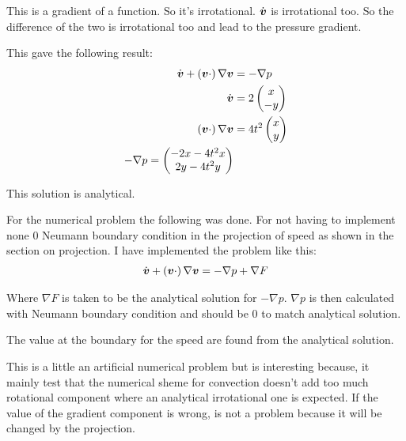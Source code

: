 This is a gradient of a function. So it's irrotational. $\dot{{\boldsymbol {v}}}$ is irrotational too.
So the difference of the two is irrotational too and lead to the pressure gradient.

This gave the following result:
\begin{align}
\dot{{\boldsymbol {v}}}+ \left({\boldsymbol {v}}\cdot\right) \nabla {\boldsymbol {v}}&=-\nabla p\\
\dot{{\boldsymbol {v}}}&=2\begin{pmatrix}
	               	x\\
	               	-y
	               \end{pmatrix}\\
\left({\boldsymbol {v}}\cdot\right) \nabla {\boldsymbol {v}}&=4t^2\begin{pmatrix}
                                                 	x\\
                                                 	y
                                                 \end{pmatrix}\\
-\nabla p=\begin{pmatrix}
           -2x-4t^2x\\
           2y-4t^2y
           \end{pmatrix}\\
\end{align}

This solution is analytical.

For the numerical problem the following was done.
For not having to implement none 0 Neumann boundary condition in the projection of speed as shown in the section on projection.
I have implemented the problem like this:
\begin{align}
	\dot{{\boldsymbol {v}}}+ \left({\boldsymbol {v}}\cdot\right) \nabla {\boldsymbol {v}}&=-\nabla p+\nabla F\\
\end{align}

Where $\nabla F$ is taken to be the analytical solution for $-\nabla p$.
$\nabla p$ is then calculated with Neumann boundary condition and should be 0 to match analytical solution.

The value at the boundary for the speed are found from the analytical solution.

This is a little an artificial numerical problem but is interesting because,
it mainly test that the numerical sheme for convection doesn't add too much rotational component
where an analytical irrotational one is expected. If the value of the gradient component is wrong, is not a problem
because it will be changed by the projection.

